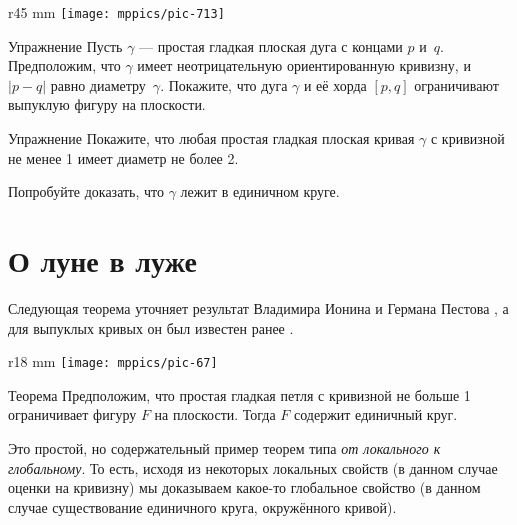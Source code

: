\begin{wrapfigure}{r}{45 mm}
\vskip-6mm
\centering
\texttt{[image: mppics/pic-713]}
\vskip0mm
\end{wrapfigure}

\begin{thm}{Упражнение}\label{ex:convex-lens}
Пусть $\gamma$ --- простая гладкая плоская дуга с концами $p$ и~$q$.
Предположим, что $\gamma$ имеет неотрицательную ориентированную кривизну, и $|p-q|$ равно диаметру~$\gamma$.
Покажите, что дуга $\gamma$ и её хорда $[p,q]$ ограничивают выпуклую фигуру на плоскости.
\end{thm}

\begin{thm}{Упражнение}\label{ex:diameter-of-simple-curve}
Покажите, что любая простая гладкая плоская кривая $\gamma$ с кривизной не менее 1 имеет диаметр не более 2.

Попробуйте доказать, что $\gamma$ лежит в единичном круге.
\end{thm}



\section{О луне в луже}

Следующая теорема уточняет результат Владимира Ионина и Германа Пестова \cite{ionin-pestov},
а для выпуклых кривых он был известен ранее \cite[\S 24]{blaschke}.


\begin{wrapfigure}{r}{18 mm}
\vskip-6mm
\centering
\texttt{[image: mppics/pic-67]}
\vskip-2mm
\end{wrapfigure}

\begin{thm}{Теорема}\label{thm:moon-orginal}
Предположим, что простая гладкая петля с кривизной не больше 1 ограничивает фигуру $F$ на плоскости.
Тогда $F$ содержит единичный круг.
\end{thm}

Это простой, но содержательный пример теорем типа {}\emph{от локального к глобальному}.
То есть, исходя из некоторых локальных свойств (в данном случае оценки на кривизну) мы доказываем какое-то глобальное свойство (в данном случае существование единичного круга, окружённого кривой).


